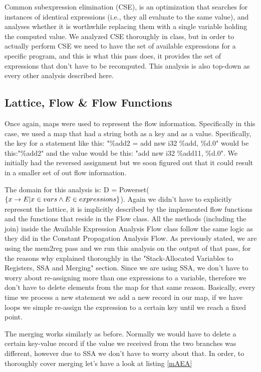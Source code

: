 Common subexpression elimination (CSE), is an optimization that searches for instances of identical expressions (i.e., they all evaluate to the same value), and analyses whether it is worthwhile replacing them with a single variable holding the computed value. We analyzed CSE thoroughly in class, but in order to actually perform CSE we need to have the set of available expressions for a specific program, and this is what this pass does, it provides the set of expressions that don't have to be recomputed. This analysis is also top-down as every other analysis described here.


\subsection*{Lattice, Flow \& Flow Functions}

Once again, maps were used to represent the flow information. Specifically in this case, we used a map that had a string both as a key and as a value. Specifically, the key for a statement like this: "\%add2 = add nsw i32 \%add, \%d.0" would be this:"\%add2" and the value would be this: "add nsw i32 \%add11, \%d.0". We initially had the reversed assignment but we soon figured out that it could result in a smaller set of out flow information.

The domain for this analysis is: D = Powerset($\{x\rightarrow E|x\in vars \wedge E\in expressions\}$). Again we didn't have to explicitly represent the lattice, it is implicitly described by the implemented flow functions and the functions that reside in the Flow class. All the methods (including the join) inside the Available Expression Analysis Flow class follow the same logic as they did in the Constant Propagation Analysis Flow. As previously stated, we are using the mem2reg pass and we run this analysis on the output of that pass, for the reasons why explained thoroughly in the "Stack-Allocated Variables to Registers, SSA and Merging" section. Since we are using SSA, we don't have to worry about re-assigning more than one expressions to a variable, therefore we don't have to delete elements from the map for that same reason. Basically, every time we process a new statement we add a new record in our map, if we have loops we simple re-assign the expression to a certain key until we reach a fixed point.



The merging works similarly as before. Normally we would have to delete a certain key-value record if the value we received from the two branches was different, however due to SSA we don't have to worry about that. In order, to thoroughly cover merging let's have a look at listing \ref{mAEA}


